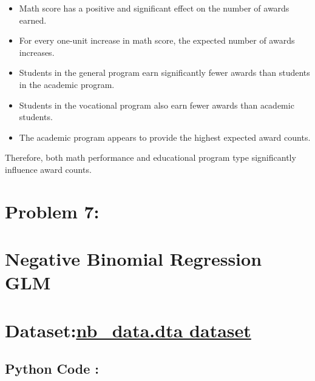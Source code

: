 \documentclass[
]{article}
\begin{document}
\begin{itemize}
\item
  Math score has a positive and significant effect on the number of
  awards earned.
\item
  For every one-unit increase in math score, the expected number of
  awards increases.
\item
  Students in the general program earn significantly fewer awards than
  students in the academic program.
\item
  Students in the vocational program also earn fewer awards than
  academic students.
\item
  The academic program appears to provide the highest expected award
  counts.
\end{itemize}

Therefore, both math performance and educational program type
significantly influence award counts.

\section{}\label{section-1}

\section{\texorpdfstring{\textbf{Problem 7:}
}{Problem 7: }}\label{problem-7}

\section{Negative Binomial Regression
GLM}\label{negative-binomial-regression-glm}

\section{\texorpdfstring{Dataset:\href{https://stats.idre.ucla.edu/stat/stata/dae/nb_data.dta?utm_source=chatgpt.com}{nb\_data.dta
dataset}}{Dataset:nb\_data.dta dataset}}\label{datasetnb_data.dta-dataset}

\subsection{\texorpdfstring{\textbf{Python Code
:}}{Python Code :}}\label{python-code-12}
\end{document}
